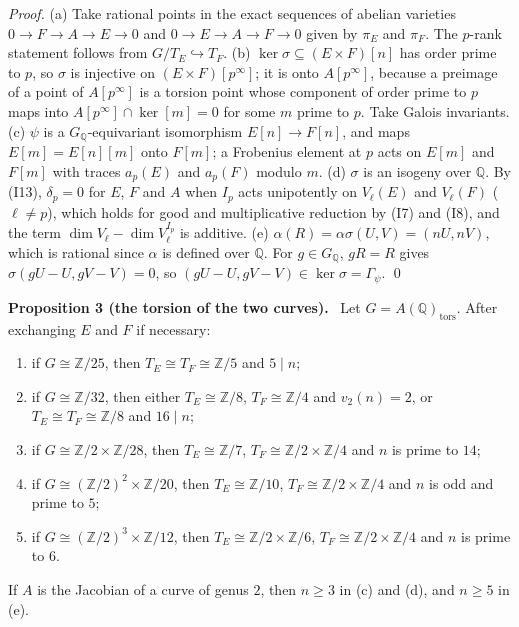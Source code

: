 \documentclass[11pt]{article}
\newenvironment{statement}[1]{\par\medskip\noindent\phantomsection\textbf{#1}\ }{\par\medskip}
\newcommand{\Q}{\mathbb Q}
\newcommand{\Z}{\mathbb Z}
\newcommand{\tors}{\mathrm{tors}}
\begin{document}
\emph{Proof.} (a) Take rational points in the exact sequences of abelian varieties \(0\to F\to A\to E\to0\) and
\(0\to E\to A\to F\to0\) given by \(\pi_E\) and \(\pi_F\). The \(p\)-rank statement follows from
\(G/T_E\hookrightarrow T_F\). (b) \(\ker\sigma\subseteq(E\times F)[n]\) has order prime to \(p\), so \(\sigma\) is
injective on \((E\times F)[p^\infty]\); it is onto \(A[p^\infty]\), because a preimage of a point of \(A[p^\infty]\)
is a torsion point whose component of order prime to \(p\) maps into \(A[p^\infty]\cap\ker[m]=0\) for some \(m\)
prime to \(p\). Take Galois invariants. (c) \(\psi\) is a \(G_{\Q}\)-equivariant isomorphism \(E[n]\to F[n]\), and
maps \(E[m]=E[n][m]\) onto \(F[m]\); a Frobenius element at \(p\) acts on \(E[m]\) and \(F[m]\) with traces
\(a_p(E)\) and \(a_p(F)\) modulo \(m\). (d) \(\sigma\) is an isogeny over \(\Q\). By (I13), \(\delta_p=0\) for
\(E\), \(F\) and \(A\) when \(I_p\) acts unipotently on \(V_\ell(E)\) and \(V_\ell(F)\) (\(\ell\neq p\)), which
holds for good and multiplicative reduction by (I7) and (I8), and the term \(\dim V_\ell-\dim V_\ell^{I_p}\) is
additive. (e) \(\alpha(R)=\alpha\sigma(U,V)=(nU,nV)\), which is rational since \(\alpha\) is defined over \(\Q\). For
\(g\in G_{\Q}\), \(gR=R\) gives \(\sigma(gU-U,gV-V)=0\), so \((gU-U,gV-V)\in\ker\sigma=\Gamma_\psi\). \qed

\begin{statement}{Proposition 3 (the torsion of the two curves).}\label{prop-parents}
Let \(G=A(\Q)_\tors\). After exchanging \(E\) and \(F\) if necessary:
\begin{enumerate}
\item[(a)] if \(G\cong\Z/25\), then \(T_E\cong T_F\cong\Z/5\) and \(5\mid n\);
\item[(b)] if \(G\cong\Z/32\), then either \(T_E\cong\Z/8\), \(T_F\cong\Z/4\) and \(v_2(n)=2\), or
\(T_E\cong T_F\cong\Z/8\) and \(16\mid n\);
\item[(c)] if \(G\cong\Z/2\times\Z/28\), then \(T_E\cong\Z/7\), \(T_F\cong\Z/2\times\Z/4\) and \(n\) is prime to
\(14\);
\item[(d)] if \(G\cong(\Z/2)^2\times\Z/20\), then \(T_E\cong\Z/10\), \(T_F\cong\Z/2\times\Z/4\) and \(n\) is odd
and prime to \(5\);
\item[(e)] if \(G\cong(\Z/2)^3\times\Z/12\), then \(T_E\cong\Z/2\times\Z/6\), \(T_F\cong\Z/2\times\Z/4\) and \(n\)
is prime to \(6\).
\end{enumerate}
If \(A\) is the Jacobian of a curve of genus \(2\), then \(n\ge3\) in (c) and (d), and \(n\ge5\) in (e).
\end{statement}
\end{document}
